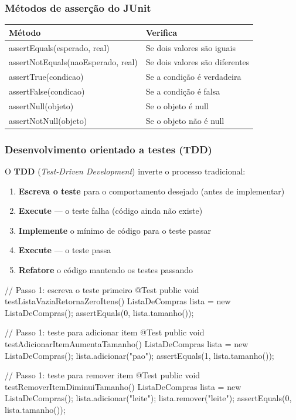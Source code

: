 \documentclass[11pt,a4paper]{article}
\renewcommand{\texttt}[1]{{\color{javaCodeInline}\small\ttfamily #1}}
\begin{document}
\subsubsection{Métodos de asserção do JUnit}

\begin{longtable}{ll}
\toprule
\textbf{Método} & \textbf{Verifica} \\
\midrule
\texttt{assertEquals(esperado, real)} & Se dois valores são iguais \\
\texttt{assertNotEquals(naoEsperado, real)} & Se dois valores são diferentes \\
\texttt{assertTrue(condicao)} & Se a condição é verdadeira \\
\texttt{assertFalse(condicao)} & Se a condição é falsa \\
\texttt{assertNull(objeto)} & Se o objeto é \texttt{null} \\
\texttt{assertNotNull(objeto)} & Se o objeto não é \texttt{null} \\
\bottomrule
\end{longtable}

\subsubsection{Desenvolvimento orientado a testes (TDD)}

O \textbf{TDD} (\textit{Test-Driven Development}) inverte o processo tradicional:

\begin{enumerate}
\item \textbf{Escreva o teste} para o comportamento desejado (antes de implementar)
\item \textbf{Execute} --- o teste falha (código ainda não existe)
\item \textbf{Implemente} o mínimo de código para o teste passar
\item \textbf{Execute} --- o teste passa
\item \textbf{Refatore} o código mantendo os testes passando
\end{enumerate}

\begin{javacode}
// Passo 1: escreva o teste primeiro
@Test
public void testListaVaziaRetornaZeroItens() {
    ListaDeCompras lista = new ListaDeCompras();
    assertEquals(0, lista.tamanho());
}

// Passo 1: teste para adicionar item
@Test
public void testAdicionarItemAumentaTamanho() {
    ListaDeCompras lista = new ListaDeCompras();
    lista.adicionar("pao");
    assertEquals(1, lista.tamanho());
}

// Passo 1: teste para remover item
@Test
public void testRemoverItemDiminuiTamanho() {
    ListaDeCompras lista = new ListaDeCompras();
    lista.adicionar("leite");
    lista.remover("leite");
    assertEquals(0, lista.tamanho());
}
\end{javacode}
\end{document}
